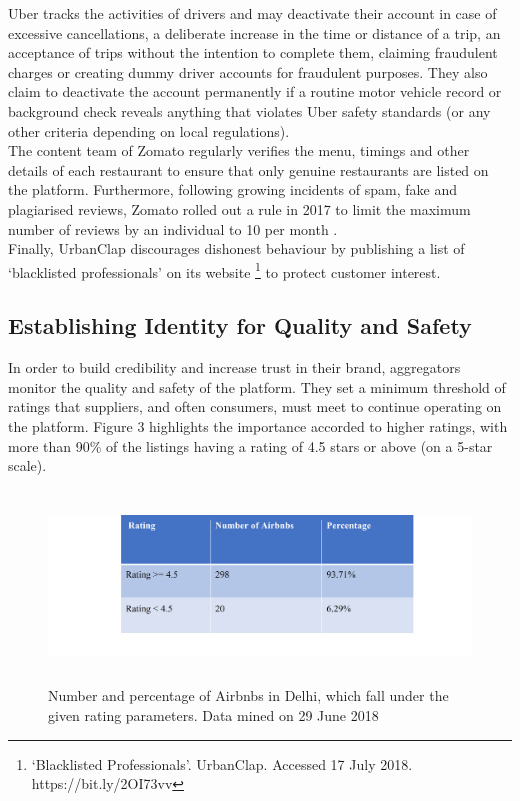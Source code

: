 \documentclass[a4paper, 12pt]{article}
\begin{document}
                  Uber tracks the activities of drivers and may deactivate their account in case of excessive cancellations, a deliberate increase in the time or distance of a trip, an acceptance of trips without the intention to complete them, claiming fraudulent charges or creating dummy driver accounts for fraudulent purposes. They also claim to deactivate the account permanently if a routine motor vehicle record or background check reveals anything that violates Uber safety standards (or any other criteria depending on local regulations). \\

The content team of Zomato regularly verifies the menu, timings and other details of each restaurant to ensure that only genuine restaurants are listed on the platform. Furthermore, following growing incidents of spam, fake and plagiarised reviews, Zomato rolled out a rule in 2017 to limit the maximum number of reviews by an individual to 10 per month \parencite{Narang17}. \\

Finally, UrbanClap discourages dishonest behaviour by publishing a list of ‘blacklisted professionals’ on its website \footnote{‘Blacklisted Professionals’. UrbanClap. Accessed 17 July 2018. https://bit.ly/2OI73vv}  to protect customer interest. 
               


     
                    \subsection{Establishing Identity for Quality and Safety }
                    
                    In order to build credibility and increase trust in their brand, aggregators monitor the quality and safety of the platform. They set a minimum threshold of ratings that suppliers, and often consumers, must meet to continue operating on the platform. Figure 3 highlights the importance accorded to higher ratings, with more than 90\% of the listings having a rating of 4.5 stars or above (on a 5-star scale). \\

\begin{figure}[h!]
\centering
\vspace{20pt}%
\includegraphics[height=2in]{figure2.png}
\caption{Number and percentage of Airbnbs in Delhi, which fall under the given rating parameters. Data mined on 29 June 2018}
\end{figure}
\end{document}

